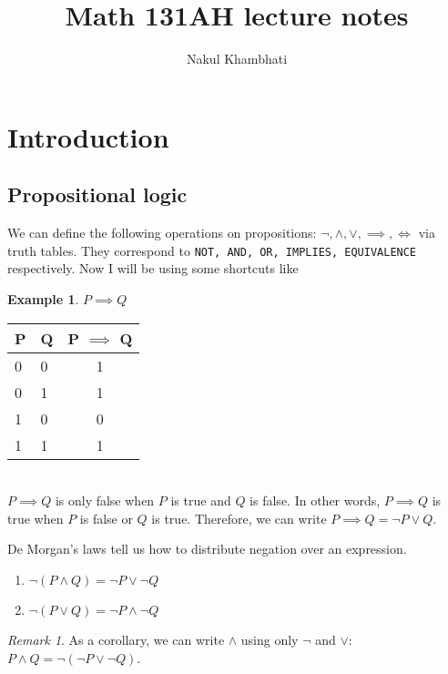 \documentclass{article}
\title{Math 131AH lecture notes}
\author{Nakul Khambhati}
\theoremstyle{definition}
\newtheorem{eg}{Example}[subsection]
\theoremstyle{remark}
\newtheorem*{remark}{Remark}
\theoremstyle{plain}
\begin{document}
\maketitle
\tableofcontents

\newpage

\section{Introduction}

\subsection{Propositional logic}

We can define the following operations on propositions: $\lnot, \land, \lor, \implies, \iff$ via truth tables. They correspond to \texttt{NOT, AND, OR, IMPLIES, EQUIVALENCE} respectively. Now I will be using some shortcuts like

\begin{eg}
$P \implies Q$
\begin{table}[h]
\begin{tabular}{|l|l|c|}
\hline
P & Q & P $\implies$ Q \\ \hline
0 & 0 & 1                           \\ \hline
0 & 1 & 1                           \\ \hline
1 & 0 & 0                           \\ \hline
1 & 1 & 1                           \\ \hline
\end{tabular}
\end{table}
\\
$P \implies Q$ is only false when $P$ is true and $Q$ is false. In other words, $P \implies Q$ is true when $P$ is false or $Q$ is true. Therefore, we can write $P \implies Q = \lnot P \lor Q$.
\end{eg}

De Morgan's laws tell us how to distribute negation over an expression.

\begin{enumerate}
    \item $\lnot(P\land Q) = \lnot P \lor \lnot Q$
    \item $\lnot(P\lor Q) = \lnot P \land \lnot Q$
\end{enumerate}

\begin{remark}
As a corollary, we can write $\land$ using only $\lnot$ and $\lor$: $P \land Q = \lnot (\lnot P \lor \lnot Q)$.
\end{remark}
\end{document}

